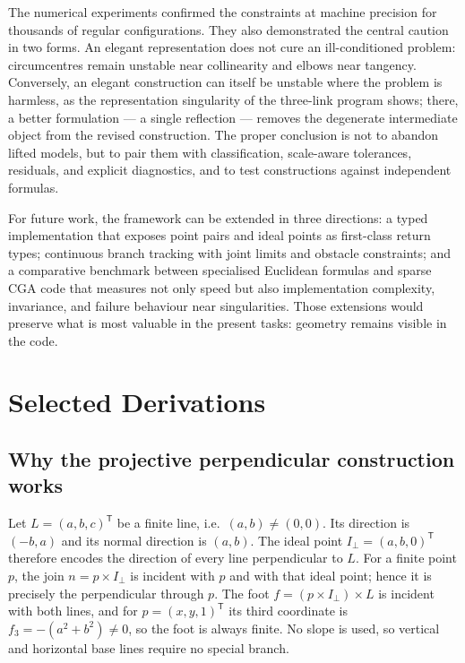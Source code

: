 \documentclass[11pt,a4paper]{article}
\theoremstyle{plain}
\theoremstyle{definition}
\theoremstyle{remark}
\newcommand{\T}{\mathsf{T}}
\begin{document}
The numerical experiments confirmed the constraints at machine precision for
thousands of regular configurations. They also demonstrated the central caution
in two forms. An elegant representation does not cure an ill-conditioned
problem: circumcentres remain unstable near collinearity and elbows near
tangency. Conversely, an elegant construction can itself be unstable where the
problem is harmless, as the representation singularity of the three-link
program shows; there, a better formulation --- a single reflection --- removes the
degenerate intermediate object from the revised construction. The proper conclusion is not to abandon lifted models, but to
pair them with classification, scale-aware tolerances, residuals, and explicit
diagnostics, and to test constructions against independent formulas.

For future work, the framework can be extended in three directions: a typed
implementation that exposes point pairs and ideal points as first-class return
types; continuous branch tracking with joint limits and obstacle constraints;
and a comparative benchmark between specialised Euclidean formulas and sparse
CGA code that measures not only speed but also implementation complexity,
invariance, and failure behaviour near singularities. Those extensions would
preserve what is most valuable in the present tasks: geometry remains visible
in the code.

\appendix
\section{Selected Derivations}\label{app:derivations}

\subsection{Why the projective perpendicular construction works}\label{app:perpendicular}

Let $L=(a,b,c)^{\T}$ be a finite line, i.e.\ $(a,b)\neq(0,0)$. Its direction is
$(-b,a)$ and its normal direction is $(a,b)$. The ideal point
$I_{\perp}=(a,b,0)^{\T}$ therefore encodes the direction of every line
perpendicular to $L$. For a finite point $p$, the join $n=p\times I_{\perp}$ is
incident with $p$ and with that ideal point; hence it is precisely the
perpendicular through $p$. The foot $f=(p\times I_{\perp})\times L$ is incident
with both lines, and for $p=(x,y,1)^{\T}$ its third coordinate is
$f_3=-(a^2+b^2)\neq0$, so the foot is always finite. No slope is used, so vertical and horizontal base lines require
no special branch.
\end{document}
